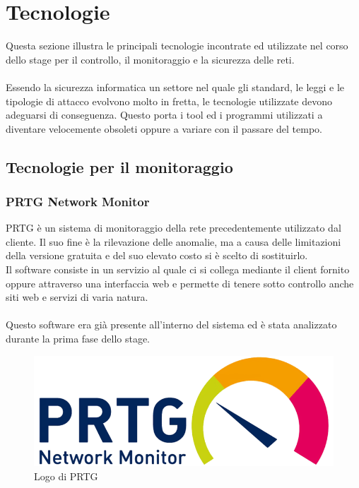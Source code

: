 \documentclass[Tesi.tex]{subfiles}
\begin{document}
	
	\clearpage\thispagestyle{empty}\mbox{}\clearpage
	\newpage
	
\chapter{Tecnologie}

Questa sezione illustra le principali tecnologie incontrate ed utilizzate nel corso dello stage per il controllo, il monitoraggio e la sicurezza delle reti. \\\\
Essendo la sicurezza informatica un settore nel quale gli standard, le leggi e le tipologie di attacco evolvono molto in fretta, le tecnologie utilizzate devono adeguarsi di conseguenza. Questo porta i tool ed i programmi utilizzati a diventare velocemente obsoleti oppure a variare con il passare del tempo.

\section{Tecnologie per il monitoraggio}
\subsection{PRTG Network Monitor}
PRTG è un sistema di monitoraggio della rete precedentemente utilizzato dal cliente. Il suo fine è la rilevazione delle anomalie, ma a causa delle limitazioni della versione gratuita e del suo elevato costo si è scelto di sostituirlo.\\
Il software consiste in un servizio al quale ci si collega mediante il client fornito oppure attraverso una interfaccia web e permette di tenere sotto controllo anche siti web e servizi di varia natura.\\\\
Questo software era già presente all'interno del sistema ed è stata analizzato durante la prima fase dello stage.
\begin{figure}[H]
	\centering
	\includegraphics[width=0.35\linewidth]{"images/logo/PRTG_logo"}
	\caption{Logo di PRTG}
	\label{fig:Logo di PRTG}
\end{figure}
\end{document}
